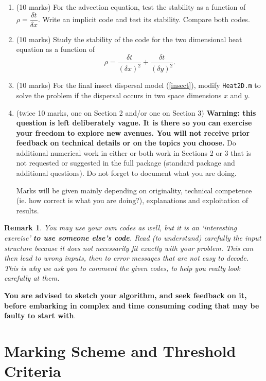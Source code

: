 \documentclass[12pt]{article}
\def\dd{\delta}
\newtheorem{remark}[theorem]{Remark}
\begin{document}
\begin{enumerate}\item (10 marks) For the advection equation, test the stability as a function of $\rho=\dfrac{\dd t}{\dd x}$.
Write an implicit code and test its stability. Compare both codes. 
\item (10 marks) Study the stability of the code for the two dimensional heat equation
as a function of
$$ \rho=\frac{\dd t}{(\dd x)^2}+\frac{\dd t}{(\dd y)^2}. $$
\item (10 marks) For the final insect dispersal model (\ref{insect}), modify \verb|Heat2D.m| to solve the problem if the dispersal 
occurs in two space dimensions $x$ and $y$.
\item (twice 10 marks, one on Section 2 and/or one on Section 3) {\bf\darkgreen Warning: this question is left deliberately vague.
It is there so you can exercise your freedom to explore new avenues.
You will not receive prior feedback on technical details
or on the topics you choose.} Do additional numerical work in either or both work in Sections 2 or 3
that is not requested or suggested in the full package (standard package and additional questions).
Do not forget to document what you are doing.

Marks will be given mainly depending on originality, technical competence (ie. how correct is
what you are doing?), explanations and exploitation of results. \end{enumerate}

\begin{remark} You may use your own codes as well, but it is an `interesting exercise'
{\darkgreen\bf to use someone else's code}. Read (to understand) carefully the input structure because
it does not necessarily fit exactly with your problem. This can then lead to wrong inputs,
then to error messages that are not easy to decode. This is why we ask you to comment
the given codes, to help you really look carefully at them. \end{remark}

{\bf\darkgreen You are advised to sketch your algorithm, and seek feedback on it,
before embarking in complex and time consuming coding that may be faulty to start with}.

\newpage

\section{Marking Scheme and Threshold Criteria}
\end{document}
